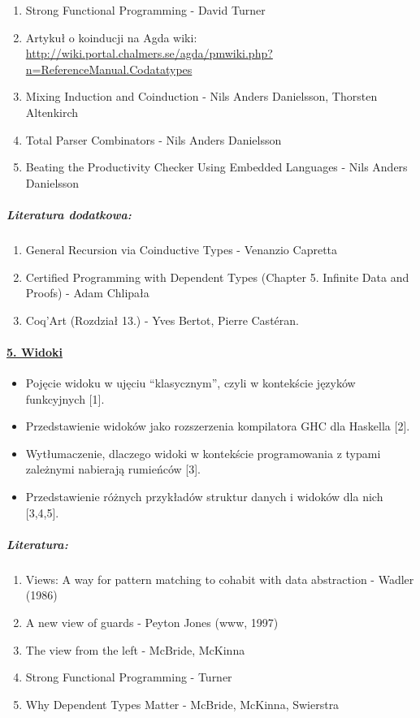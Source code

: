 \documentclass[10pt, a4paper]{article}
\begin{document}
\begin{enumerate}
\addtolength{\itemsep}{-0.5\baselineskip}
 \item Strong Functional Programming - David Turner
 \item Artykuł o koinducji na Agda wiki: \\ {\small
       \url{http://wiki.portal.chalmers.se/agda/pmwiki.php?n=ReferenceManual.Codatatypes}
      }
 \item Mixing Induction and Coinduction - Nils Anders Danielsson, Thorsten Altenkirch
 \item Total Parser Combinators - Nils Anders Danielsson
 \item Beating the Productivity Checker Using Embedded Languages - Nils Anders Danielsson
\end{enumerate}

\subparagraph{Literatura dodatkowa:}

\begin{enumerate}
\addtolength{\itemsep}{-0.5\baselineskip}
 \item General Recursion via Coinductive Types - Venanzio Capretta
 \item Certified Programming with Dependent Types (Chapter 5. Infinite Data and Proofs) - Adam Chlipała
 \item Coq’Art (Rozdział 13.) - Yves Bertot, Pierre Castéran.
\end{enumerate}

\paragraph{\underline{5. Widoki}}

\begin{itemize}
\addtolength{\itemsep}{-0.5\baselineskip}
 \item Pojęcie widoku w ujęciu “klasycznym”, czyli w kontekście języków funkcyjnych [1].
 \item Przedstawienie widoków jako rozszerzenia kompilatora GHC dla Haskella [2].
 \item Wytłumaczenie, dlaczego widoki w kontekście programowania z typami zależnymi nabierają rumieńców [3].
 \item Przedstawienie różnych przykładów struktur danych i widoków dla nich [3,4,5].
\end{itemize}

\subparagraph{Literatura:}

\begin{enumerate}
\addtolength{\itemsep}{-0.5\baselineskip}
 \item Views: A way for pattern matching to cohabit with data abstraction - Wadler (1986)
 \item A new view of guards - Peyton Jones (www, 1997)
 \item The view from the left - McBride, McKinna
 \item Strong Functional Programming - Turner
 \item Why Dependent Types Matter - McBride, McKinna, Swierstra
\end{enumerate}
\end{document}

